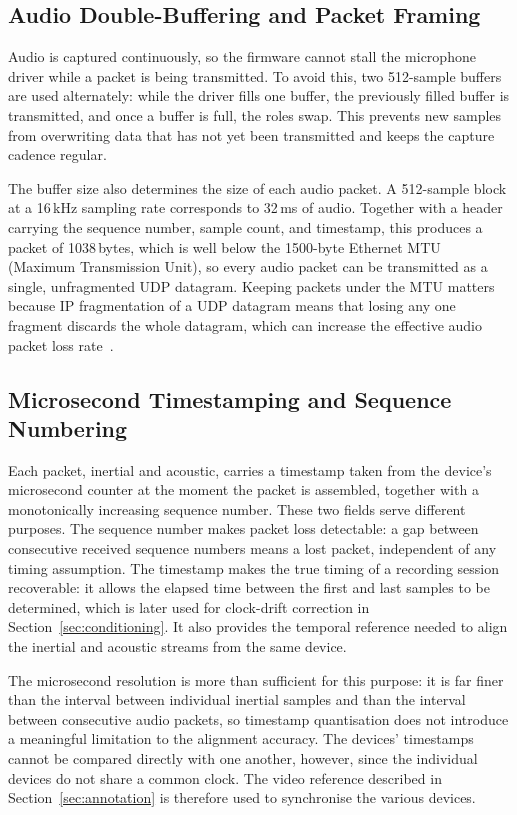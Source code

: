 \subsection{Audio Double-Buffering and Packet Framing}
\label{sec:buffering}

Audio is captured continuously, so the firmware cannot stall the microphone
driver while a packet is being transmitted. To avoid this, two 512-sample buffers
are used alternately: while the driver fills one buffer, the previously filled
buffer is transmitted, and once a buffer is full, the roles swap. This prevents
new samples from overwriting data that has not yet been transmitted and keeps the
capture cadence regular.

The buffer size also determines the size of each audio packet. A 512-sample
block at a 16\,kHz sampling rate corresponds to 32\,ms of audio. Together with a
header carrying the sequence number, sample count, and timestamp, this produces a
packet of 1038\,bytes, which is well below the 1500-byte Ethernet MTU (Maximum
Transmission Unit), so every audio packet can be transmitted as a single,
unfragmented UDP datagram. Keeping packets under the MTU matters because IP
fragmentation of a UDP datagram means that losing any one fragment discards the
whole datagram, which can increase the effective audio packet loss rate~\cite{kent1987fragmentation}.

\subsection{Microsecond Timestamping and Sequence Numbering}
\label{sec:timestamps}

Each packet, inertial and acoustic, carries a timestamp taken from the device's
microsecond counter at the moment the packet is assembled, together with a
monotonically increasing sequence number. These two fields serve different
purposes. The sequence number makes packet loss detectable: a gap between
consecutive received sequence numbers means a lost packet, independent of any
timing assumption. The timestamp makes the true timing of a recording session
recoverable: it allows the elapsed time between the first and last samples to be
determined, which is later used for clock-drift correction in
Section~\ref{sec:conditioning}. It also provides the temporal reference needed to
align the inertial and acoustic streams from the same device.

The microsecond resolution is more than sufficient for this purpose: it is far
finer than the interval between individual inertial samples and than the interval
between consecutive audio packets, so timestamp quantisation does not introduce a
meaningful limitation to the alignment accuracy. The devices' timestamps cannot be
compared directly with one another, however, since the individual devices do not
share a common clock. The video reference described in
Section~\ref{sec:annotation} is therefore used to synchronise the various
devices.

